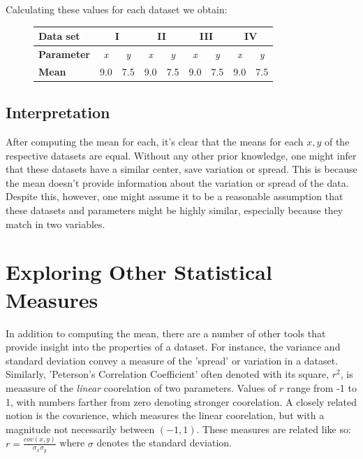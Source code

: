 \documentclass[11pt,a4paper]{article}
\begin{document}
Calculating these values for each dataset we obtain:

\begin{figure}[ht]
\centering
\begin{tabular}{|l|cc|cc|cc|cc|}
\hline
\textbf{Data set}         & \multicolumn{2}{c|}{\textbf{I}}              & \multicolumn{2}{c|}{\textbf{II}}             & \multicolumn{2}{c|}{\textbf{III}}            & \multicolumn{2}{c|}{\textbf{IV}}             \\ \hline
\textbf{Parameter} & \multicolumn{1}{c|}{\textit{x}} & \textit{y} & \multicolumn{1}{c|}{\textit{x}} & \textit{y} & \multicolumn{1}{c|}{\textit{x}} & \textit{y} & \multicolumn{1}{c|}{\textit{x}} & \textit{y} \\ \hline
\textbf{Mean}     & \multicolumn{1}{c|}{9.0}        & 7.5        & \multicolumn{1}{c|}{9.0}        & 7.5        & \multicolumn{1}{c|}{9.0}        & 7.5        & \multicolumn{1}{c|}{9.0}        & 7.5        \\ \hline
\end{tabular}
\end{figure}

\subsection{Interpretation}

After computing the mean for each, it's clear that the means for each $x, y$ of the respective datasets are equal. Without any other prior knowledge, one might infer that these datasets have a similar center, save variation or spread. This is because the mean doesn't provide information about the variation or spread of the data. Despite this, however, one might assume it to be a reasonable assumption that these datasets and parameters might be highly similar, especially because they match in two variables.

\section{Exploring Other Statistical Measures}

In addition to computing the mean, there are a number of other tools that provide insight into the properties of a dataset. For instance, the variance and standard deviation convey a measure of the 'spread' or variation in a dataset. Similarly, 'Peterson's Correlation Coefficient' often denoted with its square, $r^2$, is meaasure of the \textit{linear} coorelation of two parameters. Values of $r$ range from -1 to 1, with numbers farther from zero denoting stronger coorelation. A closely related notion is the covarience, which measures the linear coorelation, but with a magnitude not necessarily between $(-1, 1)$. These measures are related like so: $r = \frac{cov(x, y)}{\sigma_x \sigma_y}$ where $\sigma$ denotes the standard deviation.
\end{document}
